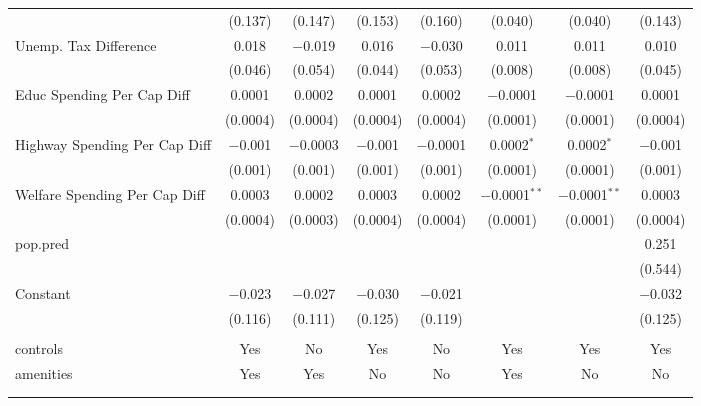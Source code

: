 \begin{table}[!htbp]
\begin{tabular}{@{\extracolsep{5pt}}lccccccc}
  & (0.137) & (0.147) & (0.153) & (0.160) & (0.040) & (0.040) & (0.143) \\ 
  Unemp. Tax Difference & 0.018 & $-$0.019 & 0.016 & $-$0.030 & 0.011 & 0.011 & 0.010 \\ 
  & (0.046) & (0.054) & (0.044) & (0.053) & (0.008) & (0.008) & (0.045) \\ 
  Educ Spending Per Cap Diff & 0.0001 & 0.0002 & 0.0001 & 0.0002 & $-$0.0001 & $-$0.0001 & 0.0001 \\ 
  & (0.0004) & (0.0004) & (0.0004) & (0.0004) & (0.0001) & (0.0001) & (0.0004) \\ 
  Highway Spending Per Cap Diff & $-$0.001 & $-$0.0003 & $-$0.001 & $-$0.0001 & 0.0002$^{*}$ & 0.0002$^{*}$ & $-$0.001 \\ 
  & (0.001) & (0.001) & (0.001) & (0.001) & (0.0001) & (0.0001) & (0.001) \\ 
  Welfare Spending Per Cap Diff & 0.0003 & 0.0002 & 0.0003 & 0.0002 & $-$0.0001$^{**}$ & $-$0.0001$^{**}$ & 0.0003 \\ 
  & (0.0004) & (0.0003) & (0.0004) & (0.0004) & (0.0001) & (0.0001) & (0.0004) \\ 
  pop.pred &  &  &  &  &  &  & 0.251 \\ 
  &  &  &  &  &  &  & (0.544) \\ 
  Constant & $-$0.023 & $-$0.027 & $-$0.030 & $-$0.021 &  &  & $-$0.032 \\ 
  & (0.116) & (0.111) & (0.125) & (0.119) &  &  & (0.125) \\ 
 \hline \\[-1.8ex] 
controls & Yes & No & Yes & No & Yes & Yes & Yes \\ 
amenities & Yes & Yes & No & No & Yes & No & No \\ 
\hline \\[-1.8ex] 
\hline 
\hline \\[-1.8ex] 
\end{tabular} 
\end{table} 
